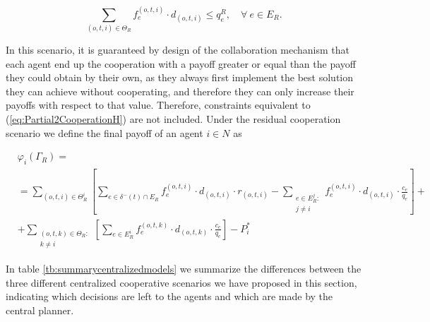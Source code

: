 \documentclass[review]{elsarticle}
\begin{document}
\begin{equation}
\sum_{(o,t,i) \in \Theta_R} f_e^{(o,t,i)}\cdot d_{(o,t,i)} \leq q_e^R,\quad \forall\ e \in E_R.
\end{equation}

    
In this scenario, it is guaranteed by design of the collaboration mechanism that each agent end up the cooperation with a payoff greater or equal than the payoff they could obtain by their own, as they always first implement the best solution they can achieve without cooperating, and therefore they can only increase their payoffs with respect to that value. Therefore, constraints equivalent to (\ref{eq:Partial2CooperationH}) are not included. Under the residual cooperation scenario we define the final payoff of an agent $i\in N$ as

\begin{equation}
    \begin{split}
    & \varphi_i(\Gamma_R) =\label{eq:ResidualCooperationPayoff} \\
    & = \sum_{(o,t,i)\in \Theta^i_R} \left[ \sum_{e \in \delta^-(t)\cap E_R} f_e^{(o,t,i)} \cdot d_{(o,t,i)} \cdot r_{(o,t,i)} -  \sum_{\substack{e\in E^j_R \colon\\ j\not = i}} f_e^{(o,t,i)} \cdot d_{(o,t,i)} \cdot \frac{c_e}{q_e} \right] + \\
    & + \sum_{\substack{(o,t,k) \in \Theta_R  \colon \\ k \not = i}} \left[\sum_{e \in E_R^i} f_e^{(o,t,k)} \cdot d_{(o,t,k)} \cdot \frac{c_e}{q_e}\right] - P_i^*
    \end{split}
\end{equation}

In table \ref{tb:summarycentralizedmodels} we summarize the differences between the three different centralized cooperative scenarios we have proposed in this section, indicating which decisions are left to the agents and which are made by the central planner.
\end{document}
